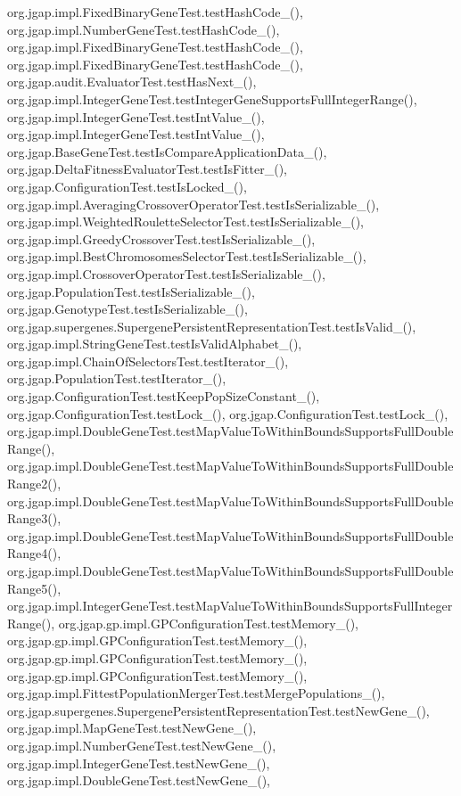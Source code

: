 org.\-jgap.\-impl.\-Fixed\-Binary\-Gene\-Test.\-test\-Hash\-Code\-\_(), org.\-jgap.\-impl.\-Number\-Gene\-Test.\-test\-Hash\-Code\-\_(), org.\-jgap.\-impl.\-Fixed\-Binary\-Gene\-Test.\-test\-Hash\-Code\-\_(), org.\-jgap.\-impl.\-Fixed\-Binary\-Gene\-Test.\-test\-Hash\-Code\-\_(), org.\-jgap.\-audit.\-Evaluator\-Test.\-test\-Has\-Next\-\_(), org.\-jgap.\-impl.\-Integer\-Gene\-Test.\-test\-Integer\-Gene\-Supports\-Full\-Integer\-Range(), org.\-jgap.\-impl.\-Integer\-Gene\-Test.\-test\-Int\-Value\-\_(), org.\-jgap.\-impl.\-Integer\-Gene\-Test.\-test\-Int\-Value\-\_(), org.\-jgap.\-Base\-Gene\-Test.\-test\-Is\-Compare\-Application\-Data\-\_(), org.\-jgap.\-Delta\-Fitness\-Evaluator\-Test.\-test\-Is\-Fitter\-\_(), org.\-jgap.\-Configuration\-Test.\-test\-Is\-Locked\-\_(), org.\-jgap.\-impl.\-Averaging\-Crossover\-Operator\-Test.\-test\-Is\-Serializable\-\_(), org.\-jgap.\-impl.\-Weighted\-Roulette\-Selector\-Test.\-test\-Is\-Serializable\-\_(), org.\-jgap.\-impl.\-Greedy\-Crossover\-Test.\-test\-Is\-Serializable\-\_(), org.\-jgap.\-impl.\-Best\-Chromosomes\-Selector\-Test.\-test\-Is\-Serializable\-\_(), org.\-jgap.\-impl.\-Crossover\-Operator\-Test.\-test\-Is\-Serializable\-\_(), org.\-jgap.\-Population\-Test.\-test\-Is\-Serializable\-\_(), org.\-jgap.\-Genotype\-Test.\-test\-Is\-Serializable\-\_(), org.\-jgap.\-supergenes.\-Supergene\-Persistent\-Representation\-Test.\-test\-Is\-Valid\-\_(), org.\-jgap.\-impl.\-String\-Gene\-Test.\-test\-Is\-Valid\-Alphabet\-\_(), org.\-jgap.\-impl.\-Chain\-Of\-Selectors\-Test.\-test\-Iterator\-\_(), org.\-jgap.\-Population\-Test.\-test\-Iterator\-\_(), org.\-jgap.\-Configuration\-Test.\-test\-Keep\-Pop\-Size\-Constant\-\_(), org.\-jgap.\-Configuration\-Test.\-test\-Lock\-\_(), org.\-jgap.\-Configuration\-Test.\-test\-Lock\-\_(), org.\-jgap.\-impl.\-Double\-Gene\-Test.\-test\-Map\-Value\-To\-Within\-Bounds\-Supports\-Full\-Double\-Range(), org.\-jgap.\-impl.\-Double\-Gene\-Test.\-test\-Map\-Value\-To\-Within\-Bounds\-Supports\-Full\-Double\-Range2(), org.\-jgap.\-impl.\-Double\-Gene\-Test.\-test\-Map\-Value\-To\-Within\-Bounds\-Supports\-Full\-Double\-Range3(), org.\-jgap.\-impl.\-Double\-Gene\-Test.\-test\-Map\-Value\-To\-Within\-Bounds\-Supports\-Full\-Double\-Range4(), org.\-jgap.\-impl.\-Double\-Gene\-Test.\-test\-Map\-Value\-To\-Within\-Bounds\-Supports\-Full\-Double\-Range5(), org.\-jgap.\-impl.\-Integer\-Gene\-Test.\-test\-Map\-Value\-To\-Within\-Bounds\-Supports\-Full\-Integer\-Range(), org.\-jgap.\-gp.\-impl.\-G\-P\-Configuration\-Test.\-test\-Memory\-\_(), org.\-jgap.\-gp.\-impl.\-G\-P\-Configuration\-Test.\-test\-Memory\-\_(), org.\-jgap.\-gp.\-impl.\-G\-P\-Configuration\-Test.\-test\-Memory\-\_(), org.\-jgap.\-gp.\-impl.\-G\-P\-Configuration\-Test.\-test\-Memory\-\_(), org.\-jgap.\-impl.\-Fittest\-Population\-Merger\-Test.\-test\-Merge\-Populations\-\_(), org.\-jgap.\-supergenes.\-Supergene\-Persistent\-Representation\-Test.\-test\-New\-Gene\-\_(), org.\-jgap.\-impl.\-Map\-Gene\-Test.\-test\-New\-Gene\-\_(), org.\-jgap.\-impl.\-Number\-Gene\-Test.\-test\-New\-Gene\-\_(), org.\-jgap.\-impl.\-Integer\-Gene\-Test.\-test\-New\-Gene\-\_(), org.\-jgap.\-impl.\-Double\-Gene\-Test.\-test\-New\-Gene\-\_(), 